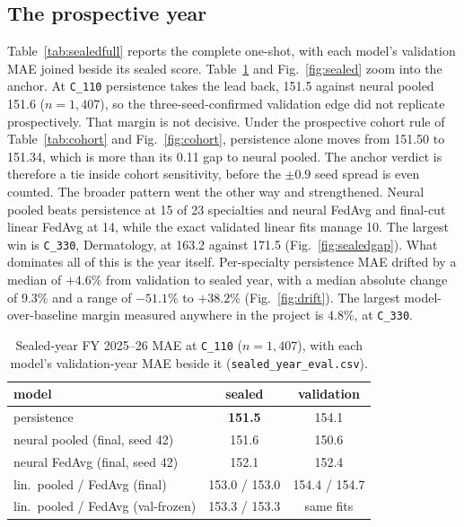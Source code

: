 \documentclass[conference]{IEEEtran}
\begin{document}
\subsection{The prospective year}
Table~\ref{tab:sealedfull} reports the complete one-shot, with each model's validation MAE joined
beside its sealed score. Table~\ref{tab:sealed} and Fig.~\ref{fig:sealed} zoom into the anchor. At
\texttt{C\_110} persistence takes the lead back, 151.5 against neural pooled 151.6
($n{=}1{,}407$), so the three-seed-confirmed validation edge did not replicate prospectively. That
margin is not decisive. Under the prospective cohort rule of Table~\ref{tab:cohort} and
Fig.~\ref{fig:cohort}, persistence alone moves from 151.50 to 151.34, which is more than its 0.11
gap to neural pooled. The anchor verdict is therefore a tie inside cohort sensitivity, before the
$\pm 0.9$ seed spread is even counted. The broader pattern went the other way and strengthened.
Neural pooled beats persistence at 15 of 23 specialties and neural FedAvg and final-cut linear
FedAvg at 14, while the exact validated linear fits manage 10. The largest win is \texttt{C\_330},
Dermatology, at 163.2 against 171.5 (Fig.~\ref{fig:sealedgap}). What dominates all of this is the
year itself. Per-specialty persistence MAE drifted by a median of $+4.6\%$ from validation to
sealed year, with a median absolute change of $9.3\%$ and a range of $-51.1\%$ to $+38.2\%$
(Fig.~\ref{fig:drift}). The largest model-over-baseline margin measured anywhere in the project is
$4.8\%$, at \texttt{C\_330}.

\begin{table}[t]
\caption{Sealed-year FY 2025--26 MAE at \texttt{C\_110} ($n{=}1{,}407$), with each model's
validation-year MAE beside it (\texttt{sealed\_year\_eval.csv}).}
\label{tab:sealed}
\centering
\footnotesize
\begin{tabular}{lcc}
\toprule
model & sealed & validation \\
\midrule
persistence & \textbf{151.5} & 154.1 \\
neural pooled (final, seed 42) & 151.6 & 150.6 \\
neural FedAvg (final, seed 42) & 152.1 & 152.4 \\
lin.\ pooled / FedAvg (final) & 153.0 / 153.0 & 154.4 / 154.7 \\
lin.\ pooled / FedAvg (val-frozen) & 153.3 / 153.3 & same fits \\
\bottomrule
\end{tabular}
\end{table}
\end{document}
